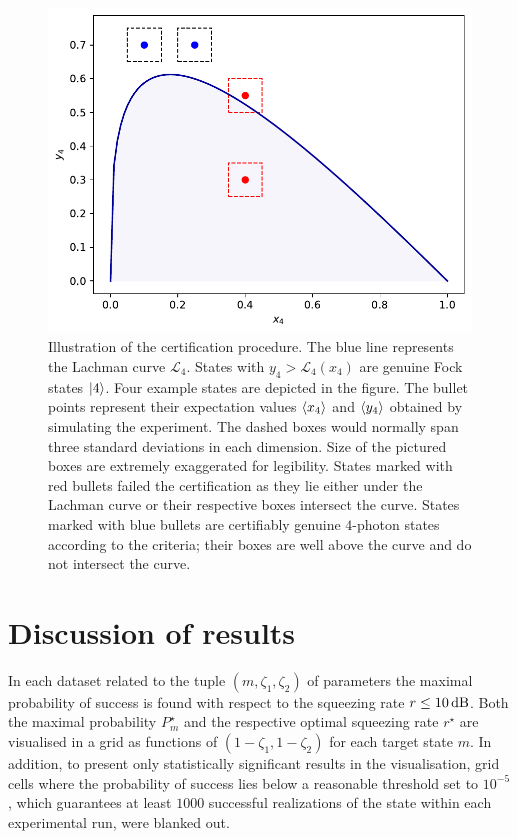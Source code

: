 \documentclass{article}
\begin{document}
\begin{figure}[h]
  \begin{center}
    \includegraphics[width = 0.50 \columnwidth]{import/illustrate_lachman_curve.pdf}
  \end{center}
  \caption{
    Illustration of the certification procedure. The blue line represents the Lachman curve $\mathcal{L}_{4}$. States with $y_{4} > \mathcal{L}_{4}(x_{4})$ are genuine Fock states $\ket{4}$. Four example states are depicted in the figure. The bullet points represent their expectation values $\langle x_{4} \rangle$ and $\langle y_{4} \rangle$ obtained by simulating the experiment. The dashed boxes would normally span three standard deviations in each dimension. Size of the pictured boxes are extremely exaggerated for legibility. States marked with red bullets failed the certification as they lie either under the Lachman curve or their respective boxes intersect the curve. States marked with blue bullets are certifiably genuine $4$-photon states according to the criteria; their boxes are well above the curve and do not intersect the curve.
  }
  \label{f-otm-il}
\end{figure}

%
%

\FloatBarrier
\section{Discussion of results}

In each dataset related to the tuple $(m, \zeta_{1}, \zeta_{2})$ of parameters the maximal probability of success is found with respect to the squeezing rate ${r \leq 10\,\mathrm{dB}}$. Both the maximal probability $P_{m}^{\star}$ and the respective optimal squeezing rate ${r^{\star}}$ are visualised in a grid as functions of ${(1 - \zeta_{1}, 1 - \zeta_{2})}$ for each target state $m$. In addition, to present only statistically significant results in the visualisation, grid cells where the probability of success lies below a reasonable threshold set to $10^{-5}$, which guarantees at least $1000$ successful realizations of the state within each experimental run, were blanked out.
\end{document}
